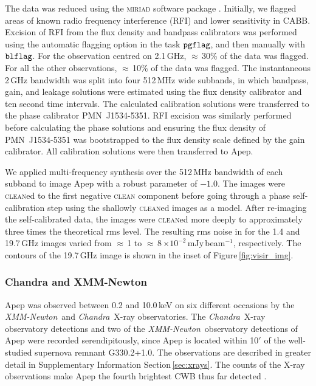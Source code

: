 \documentclass[preprint,times]{aastex61}
\newcommand{\xmm}{\emph{XMM-Newton}}
\newcommand{\chan}{\emph{Chandra}}
\begin{document}
The data was reduced using the \textsc{miriad} software package \citep{Sault1995}. Initially, we flagged areas of known radio frequency interference (RFI) and lower sensitivity in CABB. Excision of RFI from the flux density and bandpass calibrators was performed using the automatic flagging option in the task $\tt{pgflag}$, and then manually with $\tt{blflag}$. For the observation centred on 2.1\,GHz, $\approx$\,30\% of the data was flagged. For all the other observations, $\approx$\,10\% of the data was flagged. The instantaneous 2\,GHz bandwidth was split into four 512\,MHz wide subbands, in which bandpass, gain, and leakage solutions were estimated using the flux density calibrator and ten second time intervals. The calculated calibration solutions were transferred to the phase calibrator PMN~J1534-5351. RFI excision was similarly performed before calculating the phase solutions and ensuring the flux density of PMN~J1534-5351 was bootstrapped to the flux density scale defined by the gain calibrator. All calibration solutions were then transferred to Apep.

We applied multi-frequency synthesis over the 512\,MHz bandwidth of each subband to image Apep with a robust parameter of $-1.0$. The images were \textsc{clean}ed to the first negative \textsc{clean} component before going through a phase self-calibration step using the shallowly \textsc{clean}ed images as a model. After re-imaging the self-calibrated data, the images were \textsc{clean}ed more deeply to approximately three times the theoretical rms level. The resulting rms noise in for the 1.4 and 19.7\,GHz images varied from $\approx$\,1 to $\approx$\,8\,$\times 10^{-2}$\,mJy\,beam$^{-1}$, respectively. The contours of the 19.7\,GHz image is shown in the inset of Figure\,\ref{fig:visir_img}.

\subsubsection{Chandra and XMM-Newton}

Apep was observed between 0.2 and 10.0\,keV on six different occasions by the \xmm~and \chan~X-ray observatories. The \chan~X-ray observatory detections and two of the \xmm~observatory detections of Apep were recorded serendipitously, since Apep is located within 10$'$ of the well-studied supernova remnant G330.2+1.0. The observations are described in greater detail in Supplementary Information Section\,\ref{sec:xrays}. The counts of the X-ray observations make Apep the fourth brightest CWB thus far detected \citep{2018MNRAS.474.3228P}.
\end{document}
